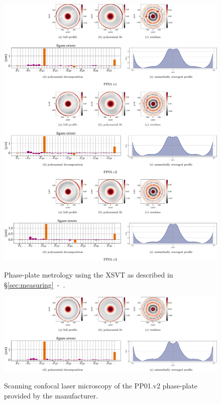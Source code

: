 \begin{refsection}
\clearpage

\begin{figure}[t]
        \centering
        {\includegraphics[width=1\linewidth]{figures/ch06/pps.pdf}}
        \caption[XSVT metrology of phase-plate PP01.v1-PP01.v3]{Phase-plate metrology using the XSVT as described in \S\ref{sec:measuring}~-~\textit{}.}\label{fig:pps}
\end{figure}

\begin{figure}[t]
        \centering
        {\includegraphics[width=1\linewidth]{figures/ch06/pp2_visible.pdf}}
        \caption[Scanning confocal laser microscopy of PP01.v2 phase-plate]{Scanning confocal laser microscopy of the PP01.v2 phase-plate provided by the manufacturer.}\label{fig:pp2_visible}
\end{figure}


\end{refsection}
